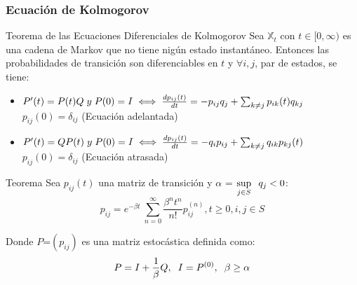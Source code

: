 \documentclass{beamer}
\begin{document}
\begin{frame}
    \frametitle{Ecuación de Kolmogorov}
    \begin{block}{Teorema de las Ecuaciones Diferenciales de Kolmogorov}
    Sea $\mathbb{X}_{t}$ con $t \in [0,\infty)$ es una cadena de Markov que no tiene nigún estado instantáneo. Entonces las probabilidades de transición son diferenciables en $t$ y $\forall i,j$, par de estados, se tiene:
\begin{itemize}
			\item $P'(t) = P(t)Q\hspace{0.1cm}y\hspace{0.1cm}P(0) = I \iff \frac{dp_{ij}(t)}{dt} = -p_{ij}q_{j} + \sum_{k \neq j} p_{ik}(t)q_{kj} \hspace{0.5cm}$
			\newline
			$ p_{ij}(0) = \delta_{ij}$  (Ecuación adelantada)
			\item $P'(t) = QP(t)\hspace{0.1cm}y\hspace{0.1cm}P(0) = I\iff \frac{dp_{ij}(t)}{dt} = -q_{i}p_{ij} + \sum_{k \neq j} q_{ik}p_{kj}(t)$
			\newline
			$p_{ij}(0) = \delta_{ij}$   (Ecuación atrasada)
\end{itemize}
    \end{block}
\end{frame}
\begin{frame}
\begin{block}{Teorema}
Sea $p_{ij}(t)$	una matriz de transición y $\alpha$ = $\sup\limits_{j\in S} \hspace{0.2cm} q_j <0$:
   		\begin{equation*}
   		p_{ij}=e^{-\beta t}\ \sum_{n = 0}^{\infty}\frac{\beta^{n} t^{n}}{n!}p_{ij}^{(n)}, t \geq 0, i,j \in S
   		\end{equation*}
   		
   		Donde $P$=$(p_{ij})$ es una matriz estocástica definida como:
   		\begin{equation*}
   		P=I+\frac{1}{\beta}Q, \hspace{0.2cm} I= P^{(0)}, \hspace{0.2cm} \beta \geq \alpha
   		\end{equation*}
\end{block}
\end{frame}
\end{document}
